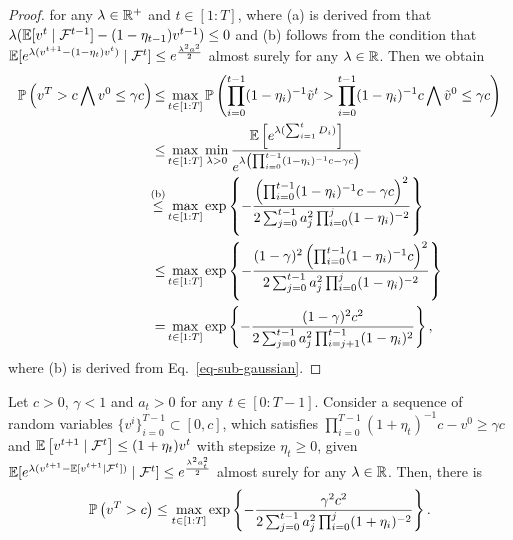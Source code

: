 \begin{proof}
    for any $\lambda\in\mathbb{R}^+$ and $t\in[1:T]$, where (a) is derived from that $\lambda(\mathbb{E}[v^t\mid\mathcal{F}^{t-1}]-(1-\eta_{t-1})v^{t-1})\leq 0$ and (b) follows from the condition that $\mathbb{E}[e^{\lambda(v^{t+1}-(1-\eta_t)v^t)}\mid\mathcal{F}^t]\leq e^{\frac{\lambda^2a^2}{2}}$ almost surely for any $\lambda\in\mathbb{R}$. Then we obtain 
    \begin{align}
        \mathbb{P}\left(v^T>c\bigwedge v^0\leq\gamma c\right){\leq}&\max_{t\in[1:T]}\mathbb{P}\left(\prod_{i=0}^{t-1}(1-\eta_i)^{-1}\Tilde{v}^{t}>\prod_{i=0}^{t-1}(1-\eta_i)^{-1}c\bigwedge\Tilde{v}^0\leq\gamma c\right)\notag
        \\
        \leq&\max_{t\in[1:T]}\min_{\lambda>0}\frac{\mathbb{E}\left[e^{\lambda(\sum_{i=1}^tD_i)}\right]}{e^{\lambda\left(\prod_{i=0}^{t-1}(1-\eta_i)^{-1}c-\gamma c\right)}}
        \notag
        \\
        \overset{\text{(b)}}{\leq}&\max_{t\in[1:T]}\exp\left\{-\frac{\left(\prod_{i=0}^{t-1}(1-\eta_i)^{-1}c-\gamma c\right)^2}{2\sum_{j=0}^{t-1}a_j^2\prod_{i=0}^{j}(1-\eta_i)^{-2}}\right\}\notag
        \\
        \leq&\max_{t\in[1:T]}\exp\left\{-\frac{(1-\gamma)^2\left(\prod_{i=0}^{t-1}(1-\eta_i)^{-1}c\right)^2}{2\sum_{j=0}^{t-1}a_j^2\prod_{i=0}^{j}(1-\eta_i)^{-2}}\right\}\notag
        \\
        =&\max_{t\in[1:T]}\exp\left\{-\frac{(1-\gamma)^2c^2}{2\sum_{j=0}^{t-1}a_j^2\prod_{i=j+1}^{t-1}(1-\eta_i)^{2}}\right\},
    \end{align}
    where (b) is derived from Eq.~\eqref{eq-sub-gaussian}.
\end{proof}

\begin{corollary}\label{aux-coro-3}
    Let $c>0$, $\gamma<1$ and $a_t>0$ for any $t\in[0:T-1]$. Consider a sequence of random variables $\{v^i\}_{i=0}^{T-1}\subset[0,c]$, which satisfies $\prod_{i=0}^{T-1}(1+\eta_t)^{-1}c-v^0\geq\gamma c$ and $\mathbb{E}\left[v^{t+1}\mid\mathcal{F}^t\right]\leq(1+\eta_t)v^t$ with stepsize $\eta_t\geq0$, given $\mathbb{E}[e^{\lambda(v^{t+1}-\mathbb{E}[v^{t+1}\mid\mathcal{F}^t])}\mid\mathcal{F}^t]\leq e^{\frac{\lambda^2a_t^2}{2}}$ almost surely for any $\lambda\in\mathbb{R}$. Then, there is 
    \begin{align}
        \mathbb{P}\left(v^T>c\right)\leq\max_{t\in[1:T]}\exp\left\{-\frac{\gamma^2c^2}{2\sum_{j=0}^{t-1}a_j^2\prod_{i=0}^{j}(1+\eta_i)^{-2}}\right\}\notag.
    \end{align}
\end{corollary}

